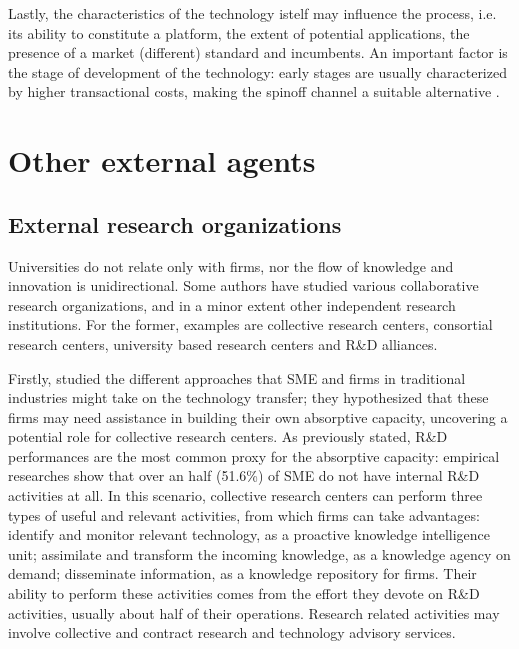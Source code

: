 Lastly, the characteristics of the technology istelf may influence the process, i.e. its ability to constitute a platform, the extent of potential applications, the presence of a market (different) standard and incumbents. An important factor is the stage of development of the technology: early stages are usually characterized by higher transactional costs, making the spinoff channel a suitable alternative \citep{Rizzo2015}. 

\section{Other external agents}

\subsection{External research organizations}

Universities do not relate only with firms, nor the flow of knowledge and innovation is unidirectional. Some authors have studied various collaborative research organizations, and in a minor extent other independent research institutions. For the former, examples are collective research centers, consortial research centers, university based research centers and R\&D alliances. 

Firstly, \citet{Spithoven2011} studied the different approaches that SME and firms in traditional industries might take on the technology transfer; they hypothesized that these firms may need assistance in building their own absorptive capacity, uncovering a potential role for collective research centers. As previously stated, R\&D performances are the most common proxy for the absorptive capacity: empirical researches show that over an half (51.6\%) of SME do not have internal R\&D activities at all. In this scenario, collective research centers can perform three types of useful and relevant activities, from which firms can take advantages: identify and monitor relevant technology, as a proactive knowledge intelligence unit; assimilate and transform the incoming knowledge, as a knowledge agency on demand; disseminate information, as a knowledge repository for firms. Their ability to perform these activities comes from the effort they devote on R\&D activities, usually about half of their operations. Research related activities may involve collective and contract research and technology advisory services.

